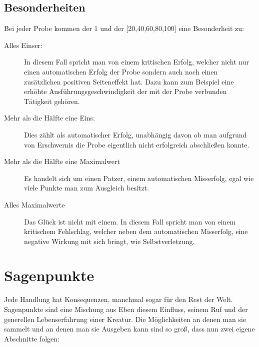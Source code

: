 \documentclass[a4paper,12pt,oneside]{book}
\begin{document}
\section{Besonderheiten}
Bei jeder Probe kommen der 1 und der [20,40,60,80,100] eine Besonderheit zu:
\begin{description}
\item[Alles Einser:]
In diesem Fall spricht man von einem kritischen Erfolg, welcher nicht nur einen automatischen Erfolg der Probe sondern auch noch einen zusätzlichen positiven Seiteneffekt hat. Dazu kann zum Beispiel eine erhöhte Ausführungsgeschwindigkeit der mit der Probe verbunden Tätigkeit gehören.
\item[Mehr als die Hälfte eine Eins:]
Dies zählt als automatischer Erfolg, unabhängig davon ob man aufgrund von Erschwernis die Probe eigentlich nicht erfolgreich abschließen konnte.
\item[Mehr als die Hälfte eine Maximalwert]
Es handelt sich um einen Patzer, einem automatischen Misserfolg, egal wie viele Punkte man zum Ausgleich besitzt.
\item[Alles Maximalwerte]
Das Glück ist nicht mit einem. In diesem Fall spricht man von einem kritischem Fehlschlag, welcher neben dem automatischen Misserfolg, eine negative Wirkung mit sich bringt, wie Selbstverletzung.
\end{description}

\chapter{Sagenpunkte}
Jede Handlung hat Konsequenzen, manchmal sogar für den Rest der Welt. Sagenpunkte sind eine Mischung aus Eben diesem Einfluss, seinem Ruf und der generellen Lebenserfahrung einer Kreatur. Die Möglichkeiten an denen man sie sammelt und an denen man sie Ausgeben kann sind so groß, dass nun zwei eigene Abschnitte folgen:
\end{document}

